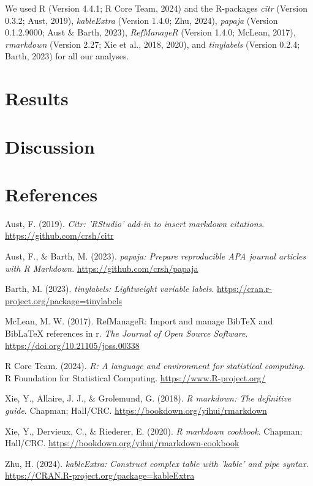 \documentclass[
  stu, a4paper]{apa7}
\newlength{\cslhangindent}
\newenvironment{CSLReferences}[2] %
 {\begin{list}{}{%
  \setlength{\itemindent}{0pt}
  \setlength{\leftmargin}{0pt}
  \setlength{\parsep}{0pt}
  \ifodd #1
   \setlength{\leftmargin}{\cslhangindent}
   \setlength{\itemindent}{-1\cslhangindent}
  \fi
  \setlength{\itemsep}{#2\baselineskip}}}
 {\end{list}}
\begin{document}
We used R (Version 4.4.1; R Core Team, 2024) and the R-packages \emph{citr} (Version 0.3.2; Aust, 2019), \emph{kableExtra} (Version 1.4.0; Zhu, 2024), \emph{papaja} (Version 0.1.2.9000; Aust \& Barth, 2023), \emph{RefManageR} (Version 1.4.0; McLean, 2017), \emph{rmarkdown} (Version 2.27; Xie et al., 2018, 2020), and \emph{tinylabels} (Version 0.2.4; Barth, 2023) for all our analyses.

\section{Results}\label{results}

\section{Discussion}\label{discussion}

\newpage

\section{References}\label{references}

\label{refs}
\begin{CSLReferences}{1}{0}
Aust, F. (2019). \emph{Citr: 'RStudio' add-in to insert markdown citations}. \url{https://github.com/crsh/citr}

Aust, F., \& Barth, M. (2023). \emph{{papaja}: {Prepare} reproducible {APA} journal articles with {R Markdown}}. \url{https://github.com/crsh/papaja}

Barth, M. (2023). \emph{{tinylabels}: Lightweight variable labels}. \url{https://cran.r-project.org/package=tinylabels}

McLean, M. W. (2017). RefManageR: Import and manage BibTeX and BibLaTeX references in r. \emph{The Journal of Open Source Software}. \url{https://doi.org/10.21105/joss.00338}

R Core Team. (2024). \emph{R: A language and environment for statistical computing}. R Foundation for Statistical Computing. \url{https://www.R-project.org/}

Xie, Y., Allaire, J. J., \& Grolemund, G. (2018). \emph{R markdown: The definitive guide}. Chapman; Hall/CRC. \url{https://bookdown.org/yihui/rmarkdown}

Xie, Y., Dervieux, C., \& Riederer, E. (2020). \emph{R markdown cookbook}. Chapman; Hall/CRC. \url{https://bookdown.org/yihui/rmarkdown-cookbook}

Zhu, H. (2024). \emph{kableExtra: Construct complex table with 'kable' and pipe syntax}. \url{https://CRAN.R-project.org/package=kableExtra}

\end{CSLReferences}
\end{document}
